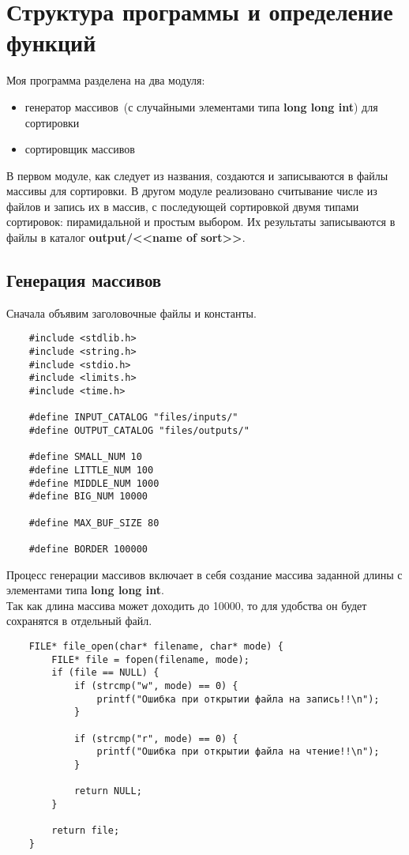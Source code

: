\documentclass[a4paper,12pt,titlepage,finall]{article}
\begin{document}
\section{Структура программы и определение функций}

Моя программа разделена на два модуля:
\begin{itemize}
    \item генератор массивов~(с случайными элементами типа \textbf{long long int}) для сортировки
    \item сортировщик массивов
\end{itemize}

В первом модуле, как следует из названия, создаются и записываются в файлы массивы для сортировки.
В другом модуле реализовано считывание числе из файлов и запись их в массив, с последующей сортировкой
двумя типами сортировок: пирамидальной и простым выбором. Их результаты записываются в файлы
в каталог \textbf{output/<<name of sort>>}.

\subsection{Генерация массивов}

Сначала объявим заголовочные файлы и константы.
\begin{verbatim}
    #include <stdlib.h>
    #include <string.h>
    #include <stdio.h>
    #include <limits.h>
    #include <time.h>
    
    #define INPUT_CATALOG "files/inputs/"
    #define OUTPUT_CATALOG "files/outputs/"
    
    #define SMALL_NUM 10
    #define LITTLE_NUM 100
    #define MIDDLE_NUM 1000
    #define BIG_NUM 10000
    
    #define MAX_BUF_SIZE 80
    
    #define BORDER 100000
\end{verbatim}

Процесс генерации массивов включает в себя создание массива заданной длины с элементами типа \textbf{long long int}. \\
Так как длина массива может доходить до 10000, то для удобства он будет сохранятся в отдельный файл.

\begin{verbatim}
    FILE* file_open(char* filename, char* mode) {
        FILE* file = fopen(filename, mode);
        if (file == NULL) {
            if (strcmp("w", mode) == 0) {
                printf("Ошибка при открытии файла на запись!!\n");
            }

            if (strcmp("r", mode) == 0) {
                printf("Ошибка при открытии файла на чтение!!\n");
            }

            return NULL;
        }

        return file;
    }
\end{verbatim}
\end{document}
